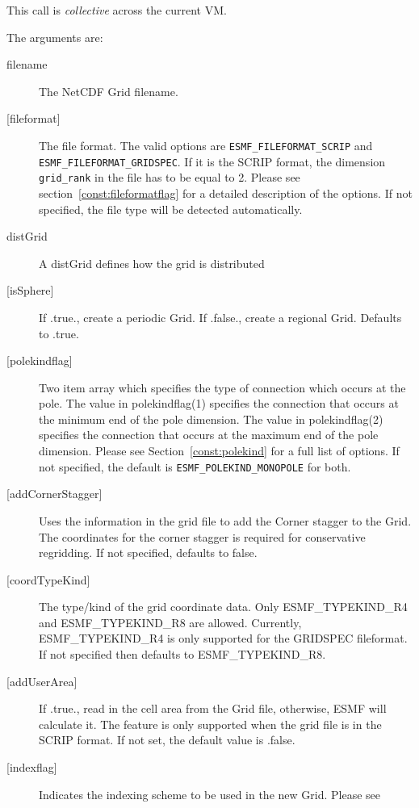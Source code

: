    This call is {\em collective} across the current VM.
  
   The arguments are:
   \begin{description}
   \item[filename]
       The NetCDF Grid filename.
   \item[{[fileformat]}]
       The file format.  The valid options are {\tt ESMF\_FILEFORMAT\_SCRIP} and {\tt ESMF\_FILEFORMAT\_GRIDSPEC}.
       If it is the SCRIP format, the dimension {\tt grid\_rank} in the file has to be equal to 2.
        Please see section~\ref{const:fileformatflag} for a detailed description of the options.  
        If not specified, the file type will be detected automatically.
   \item[distGrid]
        A distGrid defines how the grid is distributed
   \item[{[isSphere]}]
        If .true., create a periodic Grid. If .false., create a regional Grid. Defaults to .true.
   \item[{[polekindflag]}]
        Two item array which specifies the type of connection which occurs at the pole. The value in polekindflag(1)
        specifies the connection that occurs at the minimum end of the pole dimension. The value in polekindflag(2)
        specifies the connection that occurs at the maximum end of the pole dimension. Please see
        Section~\ref{const:polekind} for a full list of options. If not specified,
        the default is {\tt ESMF\_POLEKIND\_MONOPOLE} for both.
   \item[{[addCornerStagger]}]
        Uses the information in the grid file to add the Corner stagger to
        the Grid. The coordinates for the corner stagger is required for conservative
        regridding. If not specified, defaults to false.
   \item[{[coordTypeKind]}]
            The type/kind of the grid coordinate data. Only ESMF\_TYPEKIND\_R4
            and ESMF\_TYPEKIND\_R8 are allowed.  Currently, ESMF\_TYPEKIND\_R4 is only
            supported for the GRIDSPEC fileformat. 
            If not specified then defaults to ESMF\_TYPEKIND\_R8.
   \item[{[addUserArea]}]
        If .true., read in the cell area from the Grid file, otherwise, ESMF will calculate it. The feature
        is only supported when the grid file is in the SCRIP format.  If not set, the default value is
        .false.
   \item[{[indexflag]}]
        Indicates the indexing scheme to be used in the new Grid. Please see

\end{description}
